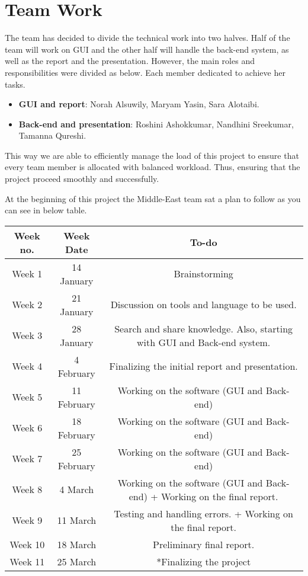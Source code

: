 \documentclass{article}
\begin{document}
\section{Team Work}
The team has decided to divide the technical work into two halves. Half of the team will work on GUI and the other half will handle the back-end system, as well as the report and the presentation. However,  the main roles and responsibilities were divided as below. Each member dedicated to achieve her tasks.
\begin{itemize}

\item \textbf{GUI and report}: Norah Alsuwily, Maryam Yasin, Sara Alotaibi. 
\item \textbf{Back-end and presentation}: Roshini Ashokkumar, Nandhini Sreekumar, Tamanna Qureshi. 
\end{itemize}
This way we are able to efficiently manage the load of this project to ensure that every team member is allocated with balanced workload. Thus, ensuring that the project proceed smoothly and successfully.



At the beginning of this project the Middle-East team sat a plan to follow as you can see in below table. 

\begin{center}
\begin{tabular}{ |c|c|c|} 
\hline
\textbf{Week no.} & \textbf{Week Date } & \textbf{To-do } \\ 
\hline
Week 1 & 14 January  & Brainstorming \\ 
\hline
Week 2 & 21 January  & Discussion  on tools and language to be used. \\ 
\hline

Week 3 & 28 January & Search and share knowledge. 
 Also, starting with GUI and Back-end system. 
 \\ 
\hline
Week 4 & 4 February & Finalizing the initial report and presentation.  \\ 
\hline
Week 5 &  11 February & Working on the software (GUI and Back-end)  \\
\hline
Week 6 & 18  February & Working on the software (GUI and Back-end)   \\ 
\hline
Week 7 & 25  February & Working on the software (GUI and Back-end)   \\ 
\hline
Week 8 & 4 March  & Working on the software (GUI and Back-end) + Working on the final report.   \\ 
\hline
Week 9 & 11 March  & Testing and handling errors. + Working on the final report.   \\ 
\hline
Week 10 & 18 March  & Preliminary final report. \\ 
\hline
Week 11 & 25 March  & *Finalizing the project  \\ 

\hline

\end{tabular}
\end{center}
\end{document}
